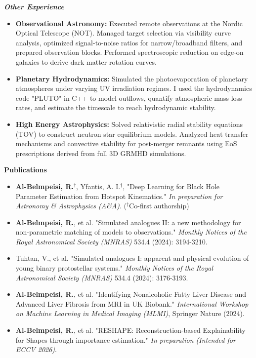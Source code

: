 \documentclass[11pt]{article}
\begin{document}
\vspace{3pt}
\noindent\textit{\textbf{Other Experience}}
\begin{itemize}[noitemsep, topsep=2pt, partopsep=0pt, parsep=2pt, leftmargin=1.5em]
    \item \textbf{Observational Astronomy:} Executed remote observations at the Nordic Optical Telescope (NOT). Managed target selection via visibility curve analysis, optimized signal-to-noise ratios for narrow/broadband filters, and prepared observation blocks. Performed spectroscopic reduction on edge-on galaxies to derive dark matter rotation curves.
    \item \textbf{Planetary Hydrodynamics:} Simulated the photoevaporation of planetary atmospheres under varying UV irradiation regimes. I used the hydrodynamics code "PLUTO" in C++ to model outflows, quantify atmospheric mass-loss rates, and estimate the timescale to reach hydrodynamic stability.
    \item \textbf{High Energy Astrophysics:} Solved relativistic radial stability equations (TOV) to construct neutron star equilibrium models. Analyzed heat transfer mechanisms and convective stability for post-merger remnants using EoS prescriptions derived from full 3D GRMHD simulations.
\end{itemize}
\begin{center}
    \textbf{Publications}
\end{center}
\begin{itemize}[noitemsep, topsep=0pt, partopsep=0pt, parsep=0pt]
    \item \textbf{Al-Belmpeisi, R.}$^\dagger$, Yfantis, A. I.$^\dagger$, "Deep Learning for Black Hole Parameter Estimation from Hotspot Kinematics." \textit{In preparation for Astronomy \& Astrophysics (A\&A)}. ($^\dagger$Co-first authorship)
    
    \item \textbf{Al-Belmpeisi, R.}, et al. "Simulated analogues II: a new methodology for non-parametric matching of models to observations." \textit{Monthly Notices of the Royal Astronomical Society (MNRAS)} 534.4 (2024): 3194-3210.
    
    \item Tuhtan, V., et al. "Simulated analogues I: apparent and physical evolution of young binary protostellar systems." \textit{Monthly Notices of the Royal Astronomical Society (MNRAS)} 534.4 (2024): 3176-3193.
    
    \item \textbf{Al-Belmpeisi, R.}, et al. "Identifying Nonalcoholic Fatty Liver Disease and Advanced Liver Fibrosis from MRI in UK Biobank." \textit{International Workshop on Machine Learning in Medical Imaging (MLMI)}, Springer Nature (2024).
    
    \item \textbf{Al-Belmpeisi, R.}, et al. "RESHAPE: Reconstruction-based Explainability for Shapes through importance estimation." \textit{In preparation (Intended for ECCV 2026)}.
\end{itemize}
\end{document}
